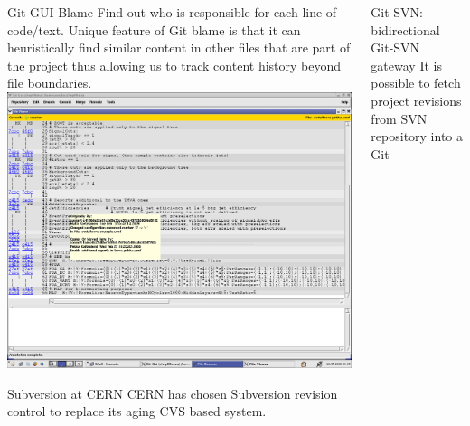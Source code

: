 \documentclass[final,hyperref={pdfpagelabels=false},notitlepage=true]{beamer}
\begin{document}
\begin{frame}{}
\begin{columns}[t]
\begin{column}{0.45\linewidth}
    \begin{block}{\large Git GUI Blame}
      Find out who is responsible for each line of code/text. Unique
      feature of Git blame is that it can heuristically find similar
      content in other files that are part of the project thus
      allowing us to track content history beyond file boundaries.
      \includegraphics[scale=1.0]{images/git-gui-blame-content-copy-detection.png}
    \end{block}

    \begin{block}{\large Subversion at CERN}
      CERN has chosen Subversion revision control to replace its aging CVS based system.
    \end{block}

    \end{column}
      \begin{column}{0.45\linewidth}

	\begin{block}{\large Git-SVN: bidirectional Git-SVN gateway}
	  It is possible to fetch project revisions from SVN repository into a Git 
	\end{block}


\end{column}
\end{columns}
\end{frame}
\end{document}
